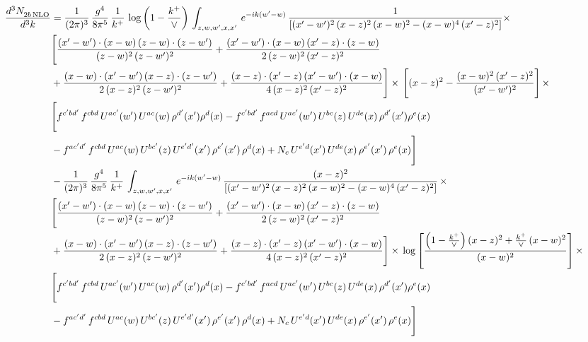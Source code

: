 \documentclass[10pt]{article}
\numberwithin{equation}{section}
\begin{document}
\begin{align}
    \frac{d^{3}N_{2b\,\rm NLO}^{\rm}}{d^{3}k}  & =  \frac{1}{(2\pi)^{3}}\, \frac{g^{4}}{8\pi^{5}}\,\frac{1}{k^{+}}\,\log{\left(1-\frac{k^{+}}{\vee}\right)}\,\int_{z,w,w^{\prime},x,x'}\, e^{-ik(w^{\prime}-w)}\, \frac{1}{\left[(x'-w')^{2}\,(x-z)^{2}\,(x-w)^{2} - (x-w)^{4}\, (x'-z)^{2}\right]} \times\notag \\ & \Bigg[\frac{(x'-w')\cdot (x-w)\, (z-w)\cdot (z-w')}{(z-w)^{2}\, (z-w')^{2}}+\frac{(x'-w')\cdot (x-w)\, (x'-z)\cdot (z-w)}{2\, (z-w)^{2}\, (x'-z)^{2}}\notag \\ & +\frac{(x-w)\cdot (x'-w')\, (x-z)\cdot (z-w')}{2\, (x-z)^{2}\, (z-w')^{2}}+\frac{(x-z)\cdot (x'-z)\, (x'-w')\cdot (x-w)}{4\, (x-z)^{2}\, (x'-z)^{2}}\Bigg] \times\,\Bigg[(x-z)^{2} - \frac{(x-w)^{2}\, (x'-z)^{2}}{(x'-w')^{2}}\Bigg]\,\times \notag \\ & \Bigg[f^{c'bd'}\,f^{cbd}\, U^{ac'}(w')\,U^{ac}(w)\,\rho^{d'}(x')\rho^{d}(x)- f^{c'bd'}\,f^{acd}\,U^{ac'}(w')\,U^{bc}(z)\,U^{de}(x)\,\rho^{d'}(x')\rho^{e}(x) \notag \\ & -f^{ac'd'}\,f^{cbd}\,U^{ac}(w)\,U^{bc'}(z)\,U^{e'd'}(x')\,\rho^{e'}(x')\,\rho^{d}(x) +N_{c}\,U^{e'd}(x')\,U^{de}(x)\,\rho^{e'}(x')\,\rho^{e}(x)\Bigg] \notag \\
&  - \frac{1}{(2\pi)^{3}}\, \frac{g^{4}}{8\pi^{5}}\,\frac{1}{k^{+}}\,\int_{z,w,w^{\prime},x,x'}\, e^{-ik(w^{\prime}-w)}\, \frac{(x-z)^{2}}{\left[(x'-w')^{2}\,(x-z)^{2}\,(x-w)^{2} - (x-w)^{4}\, (x'-z)^{2}\right]}\,  \times\notag \\ & \Bigg[\frac{(x'-w')\cdot (x-w)\, (z-w)\cdot (z-w')}{(z-w)^{2}\, (z-w')^{2}}+\frac{(x'-w')\cdot (x-w)\, (x'-z)\cdot (z-w)}{2\, (z-w)^{2}\, (x'-z)^{2}}\notag \\ & +\frac{(x-w)\cdot (x'-w')\, (x-z)\cdot (z-w')}{2\, (x-z)^{2}\, (z-w')^{2}}+\frac{(x-z)\cdot (x'-z)\, (x'-w')\cdot (x-w)}{4\, (x-z)^{2}\, (x'-z)^{2}}\Bigg] \times\,\log{\left[\frac{\left(1-\frac{k^{+}}{\vee}\right)(x-z)^{2}+\frac{k^{+}}{\vee}\,(x-w)^{2}}{(x-w)^{2}}\right]}\,\times \notag \\ & \Bigg[f^{c'bd'}\,f^{cbd}\, U^{ac'}(w')\,U^{ac}(w)\,\rho^{d'}(x')\rho^{d}(x)- f^{c'bd'}\,f^{acd}\,U^{ac'}(w')\,U^{bc}(z)\,U^{de}(x)\,\rho^{d'}(x')\rho^{e}(x) \notag \\ & -f^{ac'd'}\,f^{cbd}\,U^{ac}(w)\,U^{bc'}(z)\,U^{e'd'}(x')\,\rho^{e'}(x')\,\rho^{d}(x) +N_{c}\,U^{e'd}(x')\,U^{de}(x)\,\rho^{e'}(x')\,\rho^{e}(x)\Bigg] \notag \\

\end{align}
\end{document}
